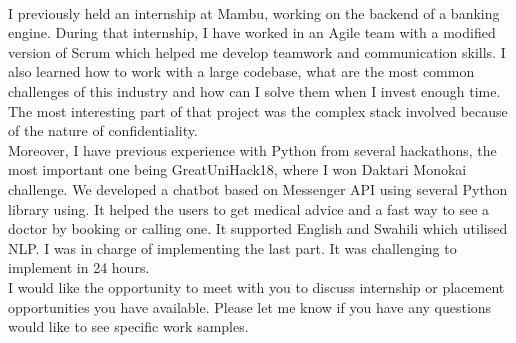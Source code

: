 \documentclass[12pt, a4paper]{awesome-cv}
\begin{document}
\begin{cvletter}
\\ \newline
I previously held an internship at Mambu, working on the backend of a banking engine. During that internship, I have worked in an Agile team with a modified version of Scrum which helped me develop teamwork and communication skills. I also learned how to work with a large codebase, what are the most common challenges of this industry and how can I solve them when I invest enough time. The most interesting part of that project was the complex stack involved because of the nature of confidentiality. \\
Moreover, I have previous experience with Python from several hackathons, the most important one being GreatUniHack18, where I won Daktari Monokai challenge. We developed a chatbot based on Messenger API using several Python library using. It helped the users to get medical advice and a fast way to see a doctor by booking or calling one. It supported English and Swahili which utilised NLP. I was in charge of implementing the last part. It was challenging to implement in 24 hours. 
\\ \newline
I would like the opportunity to meet with you to discuss internship or placement opportunities you have available. Please let me know if you have any questions would like to see specific work samples.

\end{cvletter}

\makeletterclosing
\end{document}
